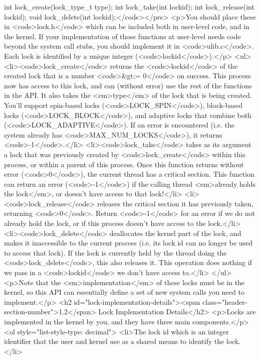 \documentclass[]{}
\begin{document}
int  lock_create(lock_type_t type);
int  lock_take(int lockid);
int  lock_release(int lockid);
void lock_delete(int lockid);</code></pre>
<p>You should place these in <code>lock.h</code> which can be included both in user-level code, and in the kernel. If your implementation of those functions at user-level needs code beyond the system call stubs, you should implement it in <code>ulib.c</code>. Each lock is identified by a unique integer (<code>lockid</code>).</p>
<ul>
<li><code>lock_create</code> returns the <code>lockid</code> of the created lock that is a number <code>&gt;= 0</code> on success. This process now has access to this lock, and can (without error) use the rest of the functions in the API. It also takes the <em>type</em> of the lock that is being created. You'll support spin-based locks (<code>LOCK_SPIN</code>), block-based locks (<code>LOCK_BLOCK</code>), and adaptive locks that combine both (<code>LOCK_ADAPTIVE</code>). If an error is encountered (i.e. the system already has <code>MAX_NUM_LOCKS</code>), it returns <code>-1</code>.</li>
<li><code>lock_take</code> takes as its argument a lock that was previously created by <code>lock_create</code> within this process, or within a parent of this process. Once this function returns without error (<code>0</code>), the current thread has a critical section. This function can return an error (<code>-1</code>) if the calling thread <em>already holds the lock</em>, or doesn't have access to that lock!</li>
<li><code>lock_release</code> releases the critical section it has previously taken, returning <code>0</code>. Return <code>-1</code> for an error if we do not already hold the lock, or if this process doesn't have access to the lock.</li>
<li><code>lock_delete</code> deallocates the kernel part of the lock, and makes it inaccessible to the current process (i.e. its lock id can no longer be used to access that lock). If the lock is currently held by the thread doing the <code>lock_delete</code>, this also releases it. This operation does nothing if we pass in a <code>lockid</code> we don't have access to.</li>
</ul>
<p>Note that the <em>implementation</em> of these locks must be in the kernel, so this API can essentially define a set of new system calls you need to implement.</p>
<h2 id="lock-implementation-details"><span class="header-section-number">1.2</span> Lock Implementation Details</h2>
<p>Locks are implemented in the kernel by you, and they have three main components.</p>
<ol style="list-style-type: decimal">
<li>The lock id which is an integer identifier that the user and kernel use as a shared means to identify the lock.</li>
\end{document}
